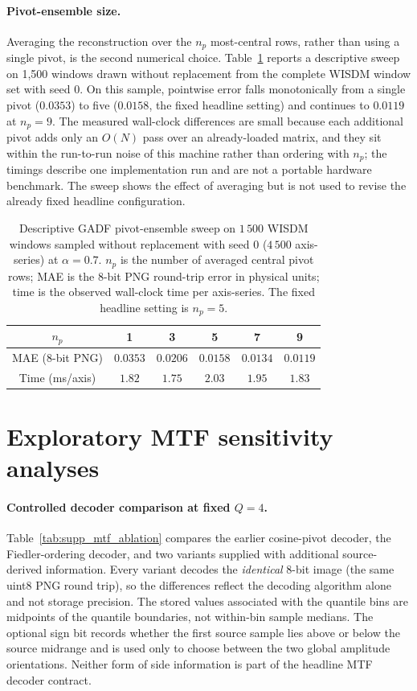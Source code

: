 \documentclass[10pt,a4paper,parskip=half-]{scrartcl}
\begin{document}
\paragraph*{Pivot-ensemble size.}
Averaging the reconstruction over the $n_p$ most-central rows, rather than using a single pivot, is the second numerical choice. Table~\ref{tab:supp_gadf_npivots} reports a descriptive sweep on 1,500 windows drawn without replacement from the complete WISDM window set with seed 0. On this sample, pointwise error falls monotonically from a single pivot ($0.0353$) to five ($0.0158$, the fixed headline setting) and continues to $0.0119$ at $n_p=9$. The measured wall-clock differences are small because each additional pivot adds only an $O(N)$ pass over an already-loaded matrix, and they sit within the run-to-run noise of this machine rather than ordering with $n_p$; the timings describe one implementation run and are not a portable hardware benchmark. The sweep shows the effect of averaging but is not used to revise the already fixed headline configuration.

\begin{table}[!htbp]
\centering
\caption{Descriptive GADF pivot-ensemble sweep on $1\,500$ WISDM windows sampled without replacement with seed 0 ($4\,500$ axis-series) at $\alpha=0.7$. $n_p$ is the number of averaged central pivot rows; MAE is the 8-bit PNG round-trip error in physical units; time is the observed wall-clock time per axis-series. The fixed headline setting is $n_p=5$.}
\label{tab:supp_gadf_npivots}
\setlength{\tabcolsep}{8pt}
\footnotesize
\begin{tabular}{cccccc}
\toprule
$n_p$ & 1 & 3 & 5 & 7 & 9 \\
\midrule
MAE (8-bit PNG) & $0.0353$ & $0.0206$ & $\mathbf{0.0158}$ & $0.0134$ & $0.0119$ \\
Time (ms/axis)  & $1.82$ & $1.75$ & $2.03$ & $1.95$ & $1.83$ \\
\bottomrule
\end{tabular}
\end{table}

\section{Exploratory MTF sensitivity analyses}

\paragraph*{Controlled decoder comparison at fixed $Q=4$.}
Table~\ref{tab:supp_mtf_ablation} compares the earlier cosine-pivot decoder, the Fiedler-ordering decoder, and two variants supplied with additional source-derived information. Every variant decodes the \emph{identical} 8-bit image (the same uint8 PNG round trip), so the differences reflect the decoding algorithm alone and not storage precision. The stored values associated with the quantile bins are midpoints of the quantile boundaries, not within-bin sample medians. The optional sign bit records whether the first source sample lies above or below the source midrange and is used only to choose between the two global amplitude orientations. Neither form of side information is part of the headline MTF decoder contract.
\end{document}
